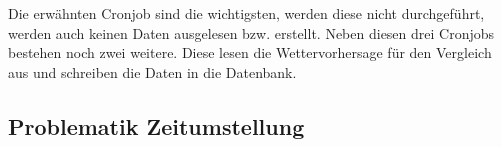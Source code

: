 Die erwähnten Cronjob sind die wichtigsten, werden diese nicht durchgeführt, werden auch keinen Daten ausgelesen bzw. erstellt. Neben diesen drei Cronjobs bestehen noch zwei weitere. Diese lesen die Wettervorhersage für den Vergleich aus und schreiben die Daten in die Datenbank.

\subsection{Problematik Zeitumstellung}

\newline
